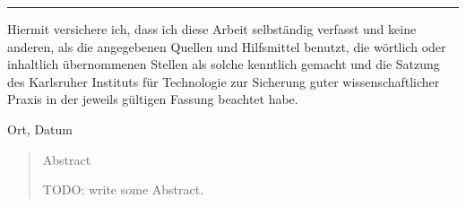 \documentclass[12pt,a4paper,twoside]{scrartcl}
\numberwithin{equation}{section}
\begin{document}

\vspace*{0pt}\vfill

\hrule\medskip

Hiermit versichere ich, dass ich diese Arbeit selbständig verfasst und keine anderen, als die angegebenen Quellen und Hilfsmittel benutzt, die wörtlich oder inhaltlich übernommenen Stellen als solche kenntlich gemacht und die Satzung des Karlsruher Instituts für Technologie zur Sicherung guter wissenschaftlicher Praxis in der jeweils gültigen Fassung beachtet habe.

\bigskip

\noindent
Ort, Datum


\vspace*{5cm}

\clearpage


\vspace*{0pt}\vfill

%
%
%

\begin{abstract}
\centerline{Abstract}
  TODO: write some Abstract.
\end{abstract}

\vfill\vfill\vfill
\clearpage


% 
% 
% 


\pagestyle{normal}
\renewcommand\sectionmark[1]{\markboth{\thesection\quad\MakeUppercase{#1}}{\thesection\quad\MakeUppercase{#1}}}
\renewcommand\subsectionmark[1]{\markright{\thesubsection\quad\MakeUppercase{#1}}}
\end{document}
